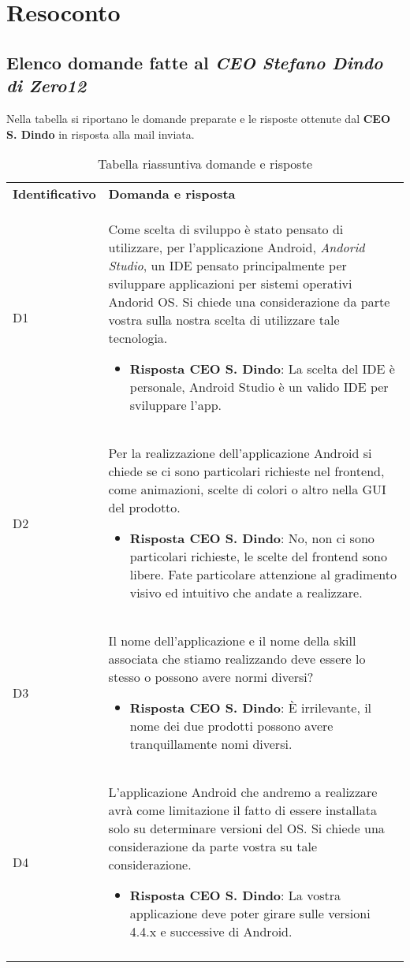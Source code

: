 \clearpage
\section{Resoconto}
	\subsection{Elenco domande fatte al \emph{CEO Stefano Dindo di Zero12}}
	Nella tabella si riportano le domande preparate e le risposte ottenute dal \textbf{CEO S. Dindo} in risposta alla mail inviata.
		\begin{center}
			\renewcommand{\arraystretch}{1.5}
			\begin{longtable}{  p{2.5cm} p{11.7cm} }
				\rowcolor{tableHeadYellow}
				\textbf{Identificativo}&\textbf{Domanda e risposta}\\
				D1 & Come scelta di sviluppo è stato pensato di utilizzare, per l'applicazione Android, \textit{Andorid Studio}, un IDE pensato principalmente per sviluppare applicazioni per sistemi operativi Andorid OS. Si chiede una considerazione da parte vostra sulla nostra scelta di utilizzare tale tecnologia.
				\begin{itemize}
					\item \textbf{Risposta CEO S. Dindo}: La scelta del IDE è personale, Android Studio è un valido IDE per sviluppare l'app.
				\end{itemize}
				\\
				D2 & Per la realizzazione dell'applicazione Android si chiede se ci sono particolari richieste nel frontend, come animazioni, scelte di colori o altro nella GUI del prodotto.
				\begin{itemize}
					\item \textbf{Risposta CEO S. Dindo}: No, non ci sono particolari richieste, le scelte del frontend sono libere. Fate particolare attenzione al gradimento visivo ed intuitivo che andate a realizzare.
				\end{itemize}
				\\
				D3 & Il nome dell'applicazione e il nome della skill associata che stiamo realizzando deve essere lo stesso o possono avere normi diversi?
				\begin{itemize}
					\item \textbf{Risposta CEO S. Dindo}: È irrilevante, il nome dei due prodotti possono avere tranquillamente nomi diversi. 
				\end{itemize}
				\\
				D4 & L'applicazione Android che andremo a realizzare avrà come limitazione il fatto di essere installata solo su determinare versioni del OS. Si chiede una considerazione da parte vostra su tale considerazione.
				\begin{itemize} 
					\item \textbf{Risposta CEO S. Dindo}: La vostra applicazione deve poter girare sulle versioni 4.4.x e successive di Android.
				\end{itemize}
				\\
				\rowcolor{white}
				\caption{Tabella riassuntiva domande e risposte}
			\end{longtable}	
		\end{center}
	
	
